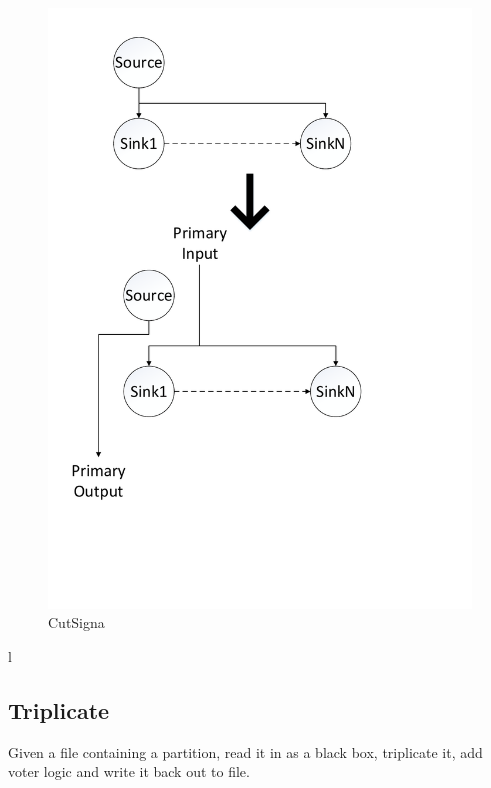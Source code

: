 \documentclass[12pt,final,oneside]{dwThesis} %
\begin{document}
   \begin{figure}

      \begin{center}

         \includegraphics[width=\linewidth]{images/CutSignal.pdf}
         \caption{CutSigna} \label{imCutSignal} 
      \end{center}

   \end{figure}

   l \newpage

   \subsection{Triplicate}
   \label{algTriplicate} Given a file containing a
   partition, read it in as a black box, triplicate it, add voter logic and
   write it back out to file.
\end{document}
